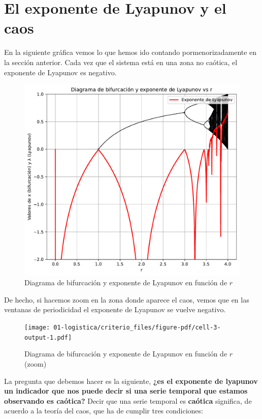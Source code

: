 \documentclass[
  10pt,
  a4paper,
  DIV=11,
  numbers=noendperiod,
  open=any]{scrreprt}
\numberwithin{equation}{chapter}
\numberwithin{equation}{section}
\renewcommand{\[}{\begin{equation}}
\renewcommand{\]}{\end{equation}}
\begin{document}
\chapter{El exponente de Lyapunov y el
caos}\label{el-exponente-de-lyapunov-y-el-caos}

En la siguiente gráfica vemos lo que hemos ido contando
pormenorizadamente en la sección anterior. Cada vez que el sistema está
en una zona no caótica, el exponente de Lyapunov es negativo.

\begin{figure}[h]
  \centering
  \includegraphics[keepaspectratio]{01-logistica/criterio_files/figure-pdf/cell-2-output-1.pdf}
  \caption{Diagrama de bifurcación y exponente de Lyapunov en función de $r$}
\end{figure}


De hecho, si hacemos zoom en la zona donde aparece el caos, vemos que en
las ventanas de periodicidad el exponente de Lyapunov se vuelve
negativo.

\begin{figure}[h]
  \centering
  \texttt{[image: 01-logistica/criterio\_files/figure-pdf/cell-3-output-1.pdf]}
  \caption{Diagrama de bifurcación y exponente de Lyapunov en función de $r$ (zoom)}
\end{figure}



La pregunta que debemos hacer es la siguiente, \textbf{¿es el exponente
de lyapunov un indicador que nos puede decir si una serie temporal que
estamos observando es caótica?} Decir que una serie temporal es \textbf{caótica} significa, de acuerdo a la teoría del caos, que ha de cumplir tres condiciones:
\end{document}
